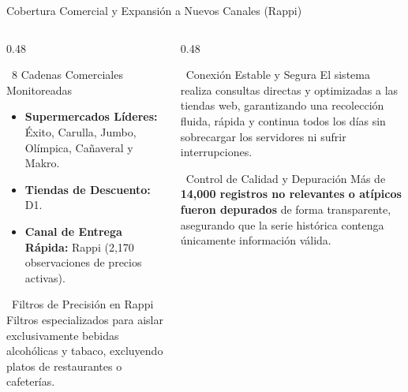 \documentclass[aspectratio=169, 10pt]{beamer}
\providecommand{\faShieldAlt}{\faLock}
\begin{document}
\begin{frame}{Cobertura Comercial y Expansión a Nuevos Canales (Rappi)}
    \begin{columns}[c]
        \begin{column}{0.48\textwidth}
            \begin{block}{\faStore\ 8 Cadenas Comerciales Monitoreadas}
                \begin{itemize}
                    \setlength{\itemsep}{4pt}
                    \item \textbf{Supermercados Líderes:} Éxito, Carulla, Jumbo, Olímpica, Cañaveral y Makro.
                    \item \textbf{Tiendas de Descuento:} D1.
                    \item \textbf{Canal de Entrega Rápida:} Rappi (2,170 observaciones de precios activas).
                \end{itemize}
            \end{block}
            \vspace{0.15cm}
            \begin{block}{\faFilter\ Filtros de Precisión en Rappi}
                \scriptsize Filtros especializados para aislar exclusivamente bebidas alcohólicas y tabaco, excluyendo platos de restaurantes o cafeterías.
            \end{block}
        \end{column}
        
        \begin{column}{0.48\textwidth}
            \begin{alertblock}{\faShieldAlt\ Conexión Estable y Segura}
                \small El sistema realiza consultas directas y optimizadas a las tiendas web, garantizando una recolección fluida, rápida y continua todos los días sin sobrecargar los servidores ni sufrir interrupciones.
            \end{alertblock}
            \vspace{0.15cm}
            \begin{block}{\faCheckCircle\ Control de Calidad y Depuración}
                \small Más de \textbf{14,000 registros no relevantes o atípicos fueron depurados} de forma transparente, asegurando que la serie histórica contenga únicamente información válida.
            \end{block}
        \end{column}
    \end{columns}
\end{frame}
\end{document}
